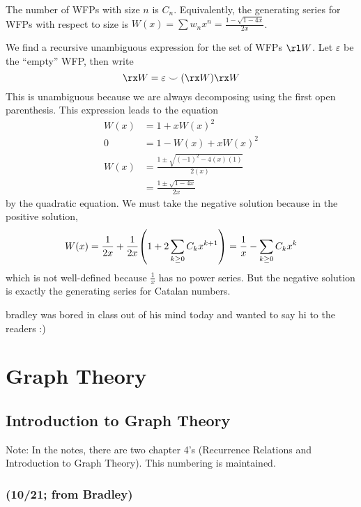 \documentclass[class=math239,notes,tikz]{agony}
\begin{document}
\begin{theorem}
  The number of WFPs with size $n$ is $C_n$.
  Equivalently, the generating series
  for WFPs with respect to size is
  $W(x) = \sum w_n x^n = \frac{1-\sqrt{1-4x}}{2x}$.
\end{theorem}
\begin{prf}
  We find a recursive unambiguous expression for the set of WFPs $\rl W$.
  Let $\varepsilon$ be the ``empty'' WFP, then write
  \[ \rx W = \varepsilon \smile (\rx W)\rx W \]
  This is unambiguous because we are always decomposing using the first open parenthesis.
  This expression leads to the equation
  \begin{align*}
    W(x) & = 1 + x W(x)^2                               \\
    0    & = 1 - W(x) + x W(x)^2                        \\
    W(x) & = \frac{1 \pm \sqrt{(-1)^2 - 4(x)(1)}}{2(x)} \\
         & = \frac{1 \pm \sqrt{1-4x}}{2x}
  \end{align*}
  by the quadratic equation.
  We must take the negative solution because in the positive solution,
  \[
    W(x) = \frac{1}{2x} + \frac{1}{2x}\qty(1+2\sum_{k\geq 0}C_kx^{k+1})
    = \frac{1}{x} - \sum_{k\geq 0}C_k x^k
  \]
  which is not well-defined because $\frac1x$ has no power series.
  But the negative solution is exactly the generating series for Catalan numbers.
\end{prf}

\begin{theorem}
  bradley was bored in class out of his mind today and wanted to say hi to the readers :)
\end{theorem}

\part{Graph Theory}

\setcounter{chapter}{3}
\chapter{Introduction to Graph Theory}

Note: In the notes, there are two chapter 4's
(Recurrence Relations and Introduction to Graph Theory).
This numbering is maintained.

\section{(10/21; from Bradley)}
\end{document}
